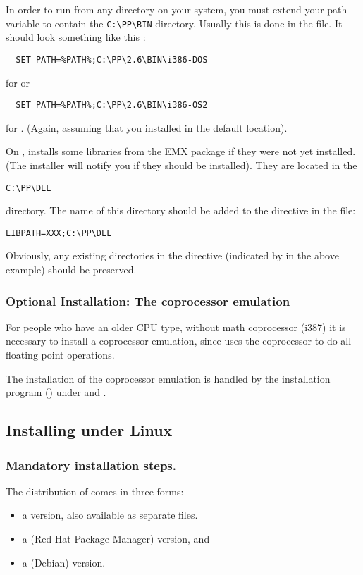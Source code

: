 In order to run \fpc from any directory on your system, you must extend
your path variable to contain the \verb|C:\PP\BIN| directory.
Usually this is done in the  file.
It should look something like this :
\begin{verbatim}
  SET PATH=%PATH%;C:\PP\2.6\BIN\i386-DOS
\end{verbatim}
for \dos or 
\begin{verbatim}
  SET PATH=%PATH%;C:\PP\2.6\BIN\i386-OS2
\end{verbatim}
for \ostwo.
(Again, assuming that you installed in the default location).

On \ostwo, \fpc installs some libraries from the EMX package if they
were not yet installed. (The installer will notify you if they should be
installed). They are located in the 
\begin{verbatim}
C:\PP\DLL
\end{verbatim}
directory. The name of this directory should be added to the 
directive in the  file:
\begin{verbatim}
LIBPATH=XXX;C:\PP\DLL
\end{verbatim}
Obviously, any existing directories in the  directive
(indicated by  in the above example) should be preserved.

\subsubsection{Optional Installation: The coprocessor emulation}
For people who have an older CPU type, without math coprocessor (i387)
it is necessary to install a coprocessor emulation, since \fpc uses the
coprocessor to do all floating point operations.

The installation of the coprocessor emulation is handled by the
installation program () under \dos and \windows.

%
%
\subsection{Installing under Linux}
\subsubsection{Mandatory installation steps.}
The \linux distribution of \fpc comes in three forms:
\begin{itemize}
\item a  version, also available as separate files.
\item a  (Red Hat Package Manager) version, and
\item a  (Debian) version.
\end{itemize}

